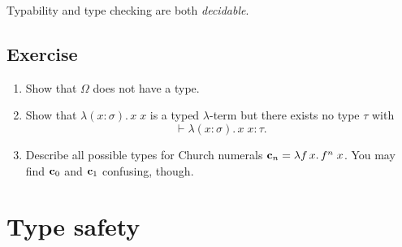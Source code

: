 \begin{theorem}
  Typability and type checking are both \emph{decidable}.
\end{theorem}

\subsection*{Exercise}
\begin{enumerate}
  \item Show that $\Omega$ does not have a type.
  \item Show that $\lambda (x : \sigma).\, x\; x$ is a typed $\lambda$-term but
    there exists no type $\tau$ with 
    \[
      \vdash \lambda (x : \sigma).\, x\; x : \tau.
    \]
  \item Describe all possible types for Church numerals $\mathbf{c}_{n} = \lambda
    f\,x.\, f^n\;x$. You may find $\mathbf{c}_{0}$ and $\mathbf{c}_{1}$ confusing, though.
  \end{enumerate}
\section{Type safety}
